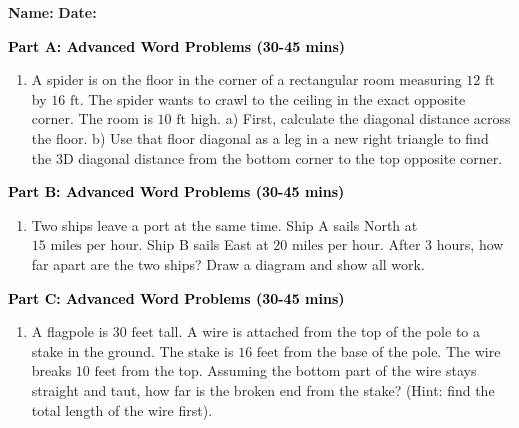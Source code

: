 \documentclass[12pt, letterpaper, fleqn]{article}
\begin{document}
\textbf{Name:} \underline{\hspace{5cm}}
\hfill
\textbf{Date:} \underline{\hspace{3cm}}\\


\begin{tcolorbox}[colback=customteal!20]
\large\textcolor{black}{\textbf{Part A: Advanced Word Problems (30-45 mins)}}
\end{tcolorbox}

\vspace{3mm}

\begin{enumerate}[itemsep=5.5cm, leftmargin=0.6cm]
\item A spider is on the floor in the corner of a rectangular room measuring $12\text{ ft}$ by $16\text{ ft}$. The spider wants to crawl to the ceiling in the exact opposite corner. The room is $10\text{ ft}$ high. 
a) First, calculate the diagonal distance across the floor.
b) Use that floor diagonal as a leg in a new right triangle to find the 3D diagonal distance from the bottom corner to the top opposite corner.
\end{enumerate}

\newpage

\begin{tcolorbox}[colback=customteal!20]
\large\textcolor{black}{\textbf{Part B: Advanced Word Problems (30-45 mins)}}
\end{tcolorbox}

\vspace{3mm}

\begin{enumerate}[itemsep=5.5cm, leftmargin=0.6cm, resume]
\item Two ships leave a port at the same time. Ship A sails North at $15\text{ miles per hour}$. Ship B sails East at $20\text{ miles per hour}$. After 3 hours, how far apart are the two ships? Draw a diagram and show all work.
\end{enumerate}

\newpage

\begin{tcolorbox}[colback=customteal!20]
\large\textcolor{black}{\textbf{Part C: Advanced Word Problems (30-45 mins)}}
\end{tcolorbox}

\vspace{3mm}

\begin{enumerate}[itemsep=5.5cm, leftmargin=0.6cm, resume]
\item A flagpole is $30\text{ feet}$ tall. A wire is attached from the top of the pole to a stake in the ground. The stake is $16\text{ feet}$ from the base of the pole. The wire breaks $10\text{ feet}$ from the top. Assuming the bottom part of the wire stays straight and taut, how far is the broken end from the stake? (Hint: find the total length of the wire first).
\end{enumerate}
\end{document}
